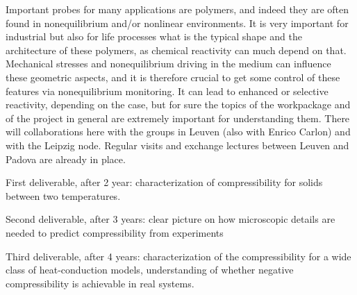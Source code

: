 \begin{workpackage}
\begin{tasklist}
  \begin{task}[title=TASK3,id=task3,PM=6,lead=UNIPD,wphases={18-24!0.5,24-48!1},partners={KUL,ULEI}]
Important probes for many applications are polymers, and indeed they are often found in nonequilibrium and/or nonlinear environments.
It is very important for industrial but also for life processes what is the typical shape and the architecture of these polymers, as chemical reactivity can much depend on that.
Mechanical stresses and nonequilibrium driving in the medium can influence these geometric aspects, and it is therefore crucial to get some control of these features via nonequilibrium monitoring.
It can lead to enhanced or selective reactivity, depending on the case, but for sure the topics of the workpackage and of the project in general are extremely important for understanding them.
There will collaborations here with the groups in Leuven (also with Enrico Carlon) and with the Leipzig node.  Regular visits and exchange lectures between Leuven and Padova are already in place.
  \end{task}

\end{tasklist}

\begin{wpdelivs}
  \begin{wpdeliv}[due=24,id=mydeliv1,dissem=PU,nature=DEM,lead=UNIPD]
      {First deliverable, after 2 year: characterization of compressibility for solids between two temperatures.}
  \end{wpdeliv}
  \begin{wpdeliv}[due=36,id=mydeliv2,dissem=PU,nature=DEM,lead=UNIPD]
      {Second deliverable, after 3 years: clear picture on how microscopic details are needed to predict compressibility from experiments}
  \end{wpdeliv}
  \begin{wpdeliv}[due=48,id=mydeliv3,dissem=PU,nature=DEM,lead=UNIPD]
      {Third deliverable, after 4 years: characterization of the compressibility for a wide class of heat-conduction models, understanding of whether negative compressibility is achievable in real systems.}
\end{wpdeliv}
\end{wpdelivs}




\end{workpackage}
